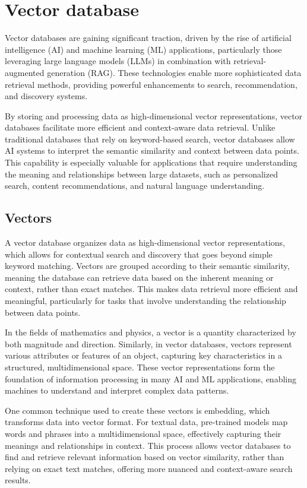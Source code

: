 \section{Vector database}

Vector databases are gaining significant traction, driven by the rise of artificial intelligence (AI) and machine learning (ML) applications, particularly those leveraging large language models (LLMs) in combination with retrieval-augmented generation (RAG). 
These technologies enable more sophisticated data retrieval methods, providing powerful enhancements to search, recommendation, and discovery systems. 

By storing and processing data as high-dimensional vector representations, vector databases facilitate more efficient and context-aware data retrieval. 
Unlike traditional databases that rely on keyword-based search, vector databases allow AI systems to interpret the semantic similarity and context between data points. 
This capability is especially valuable for applications that require understanding the meaning and relationships between large datasets, such as personalized search, content recommendations, and natural language understanding.

\subsection{Vectors}
A vector database organizes data as high-dimensional vector representations, which allows for contextual search and discovery that goes beyond simple keyword matching. 
Vectors are grouped according to their semantic similarity, meaning the database can retrieve data based on the inherent meaning or context, rather than exact matches. 
This makes data retrieval more efficient and meaningful, particularly for tasks that involve understanding the relationship between data points.

In the fields of mathematics and physics, a vector is a quantity characterized by both magnitude and direction. 
Similarly, in vector databases, vectors represent various attributes or features of an object, capturing key characteristics in a structured, multidimensional space. 
These vector representations form the foundation of information processing in many AI and ML applications, enabling machines to understand and interpret complex data patterns.

One common technique used to create these vectors is embedding, which transforms data into vector format. 
For textual data, pre-trained models map words and phrases into a multidimensional space, effectively capturing their meanings and relationships in context. 
This process allows vector databases to find and retrieve relevant information based on vector similarity, rather than relying on exact text matches, offering more nuanced and context-aware search results.

